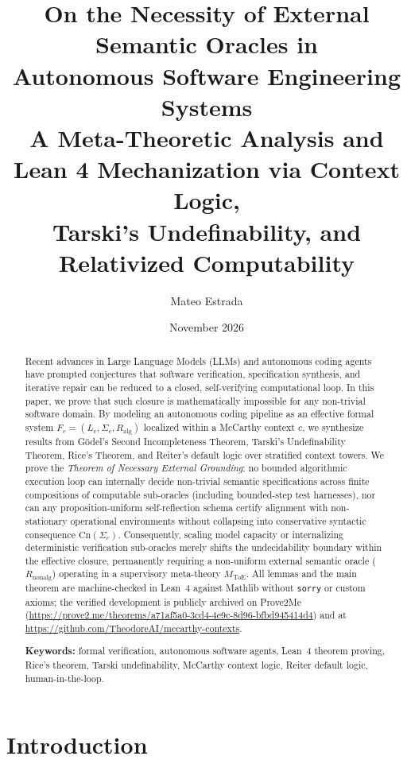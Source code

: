 \documentclass[11pt]{article}
\title{\textbf{On the Necessity of External Semantic Oracles in\\
Autonomous Software Engineering Systems}\\[0.35em]
\large A Meta-Theoretic Analysis and Lean 4 Mechanization via Context Logic,\\
Tarski's Undefinability, and Relativized Computability}
\author{Mateo Estrada}
\date{November 2026}
\theoremstyle{plain}
\theoremstyle{definition}
\theoremstyle{remark}
\newcommand{\Cn}{\mathrm{Cn}}
\newcommand{\Rnonalg}{R_{\mathrm{nonalg}}}
\newcommand{\Ralg}{R_{\mathrm{alg}}}
\newcommand{\MToE}{M_{\mathrm{ToE}}}
\begin{document}
\maketitle

\begin{abstract}
Recent advances in Large Language Models (LLMs) and autonomous coding agents have
prompted conjectures that software verification, specification synthesis, and
iterative repair can be reduced to a closed, self-verifying computational loop.
In this paper, we prove that such closure is mathematically impossible for any
non-trivial software domain. By modeling an autonomous coding pipeline as an
effective formal system $F_c = (L_c, \Sigma_c, \Ralg)$ localized within a
McCarthy context $c$, we synthesize results from G\"odel's Second Incompleteness
Theorem, Tarski's Undefinability Theorem, Rice's Theorem, and Reiter's default
logic over stratified context towers. We prove the \emph{Theorem of Necessary
External Grounding}: no bounded algorithmic execution loop can internally decide
non-trivial semantic specifications across finite compositions of computable
sub-oracles (including bounded-step test harnesses), nor can any
proposition-uniform self-reflection schema certify alignment with non-stationary
operational environments without collapsing into conservative syntactic
consequence $\Cn(\Sigma_c)$. Consequently, scaling model capacity or
internalizing deterministic verification sub-oracles merely shifts the
undecidability boundary within the effective closure, permanently requiring a
non-uniform external semantic oracle ($\Rnonalg$) operating in a supervisory
meta-theory $\MToE$. All lemmas and the main theorem are machine-checked in
Lean~4 against Mathlib without \texttt{sorry} or custom axioms; the verified
development is publicly archived on Prove2Me
(\url{https://prove2.me/theorems/a71af5a0-3cd4-4e9c-8d96-bfbd945414d4}) and at
\url{https://github.com/TheodoreAI/mccarthy-contexts}.

\smallskip
\noindent\textbf{Keywords:} formal verification, autonomous software agents,
Lean~4 theorem proving, Rice's theorem, Tarski undefinability, McCarthy context
logic, Reiter default logic, human-in-the-loop.
\end{abstract}

\section{Introduction}
\end{document}

